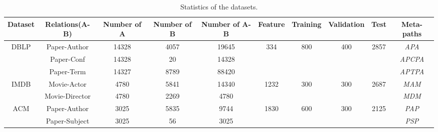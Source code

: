 \begin{table*}[]
	\centering
	\caption{Statistics of the datasets.}
	\label{table_datasets}
	\begin{tabular}{|c|c|c|c|c|c|c|c|c|c|}
		\hline
		Dataset               & Relations(A-B) & Number of A & Number of B & Number of A-B & Feature               & Training             & Validation           & Test                  & Meta-paths \\ \hline
		\multirow{3}{*}{DBLP} & Paper-Author   & 14328       & 4057        & 19645         & \multirow{3}{*}{334}  & \multirow{3}{*}{800} & \multirow{3}{*}{400} & \multirow{3}{*}{2857} & \emph{APA}        \\ \cline{2-5} \cline{10-10} 
		& Paper-Conf     & 14328       & 20          & 14328         &                       &                      &                      &                       & \emph{APCPA}      \\ \cline{2-5} \cline{10-10} 
		& Paper-Term     & 14327       & 8789        & 88420         &                       &                      &                      &                       & \emph{APTPA}      \\ \hline
		\multirow{2}{*}{IMDB} & Movie-Actor    & 4780        & 5841        & 14340         & \multirow{2}{*}{1232} & \multirow{2}{*}{300} & \multirow{2}{*}{300} & \multirow{2}{*}{2687} & \emph{MAM}        \\ \cline{2-5} \cline{10-10} 
		& Movie-Director & 4780        & 2269        & 4780          &                       &                      &                      &                       & \emph{MDM}        \\ \hline
		\multirow{2}{*}{ACM}  & Paper-Author   & 3025        & 5835        & 9744          & \multirow{2}{*}{1830} & \multirow{2}{*}{600} & \multirow{2}{*}{300} & \multirow{2}{*}{2125} & \emph{PAP}        \\ \cline{2-5} \cline{10-10} 
		& Paper-Subject  & 3025        & 56          & 3025          &                       &                      &                      &                       & \emph{PSP}        \\ \hline
	\end{tabular}
	
\end{table*}

